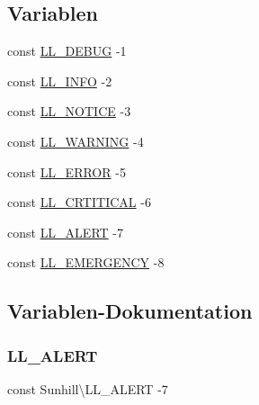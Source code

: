 \subsection*{Variablen}
\begin{DoxyCompactItemize}
\item 
const \hyperlink{namespaceSunhill_aa81a8ba0a946e1ae6e8052ed3fb287b9}{L\+L\+\_\+\+D\+E\+B\+UG} -\/1
\item 
const \hyperlink{namespaceSunhill_a20ab942ef407f9ee67ecdffea22342ea}{L\+L\+\_\+\+I\+N\+FO} -\/2
\item 
const \hyperlink{namespaceSunhill_a00054d338cccda7e89a39f3dd399cbe2}{L\+L\+\_\+\+N\+O\+T\+I\+CE} -\/3
\item 
const \hyperlink{namespaceSunhill_a931aba40f1eb07e632a24d26129b1c89}{L\+L\+\_\+\+W\+A\+R\+N\+I\+NG} -\/4
\item 
const \hyperlink{namespaceSunhill_a18824a9b58f9659012bf40e63af95a29}{L\+L\+\_\+\+E\+R\+R\+OR} -\/5
\item 
const \hyperlink{namespaceSunhill_ae795331bde625992598959c1f2e70caa}{L\+L\+\_\+\+C\+R\+T\+I\+T\+I\+C\+AL} -\/6
\item 
const \hyperlink{namespaceSunhill_a99e0b75bfa2ba003918968ad49b440b8}{L\+L\+\_\+\+A\+L\+E\+RT} -\/7
\item 
const \hyperlink{namespaceSunhill_ac2b5d8b023dc1b808d7e16273bb3a3ab}{L\+L\+\_\+\+E\+M\+E\+R\+G\+E\+N\+CY} -\/8
\end{DoxyCompactItemize}


\subsection{Variablen-\/\+Dokumentation}
\mbox{\label{namespaceSunhill_a99e0b75bfa2ba003918968ad49b440b8}} 
\subsubsection{\texorpdfstring{L\+L\+\_\+\+A\+L\+E\+RT}{LL\_ALERT}}
{\footnotesize\ttfamily const Sunhill\textbackslash{}\+L\+L\+\_\+\+A\+L\+E\+RT -\/7}

\mbox{\label{namespaceSunhill_ae795331bde625992598959c1f2e70caa}} 
